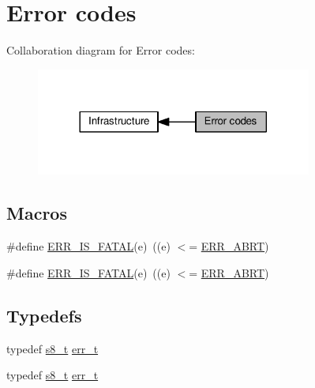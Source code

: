 \hypertarget{group__infrastructure__errors}{}\section{Error codes}
\label{group__infrastructure__errors}
Collaboration diagram for Error codes\+:
\nopagebreak
\begin{figure}[H]
\begin{center}
\leavevmode
\includegraphics[width=257pt]{group__infrastructure__errors}
\end{center}
\end{figure}
\subsection*{Macros}
\begin{DoxyCompactItemize}
\item 
\#define \hyperlink{group__infrastructure__errors_gac36f9cda08ffce1f67529a432a046248}{E\+R\+R\+\_\+\+I\+S\+\_\+\+F\+A\+T\+AL}(e)~((e) $<$= \hyperlink{group__infrastructure__errors_ggae2e66c7d13afc90ffecd6151680fbadcaf316b2c5eee4079820f7100849115142}{E\+R\+R\+\_\+\+A\+B\+RT})
\item 
\#define \hyperlink{group__infrastructure__errors_gac36f9cda08ffce1f67529a432a046248}{E\+R\+R\+\_\+\+I\+S\+\_\+\+F\+A\+T\+AL}(e)~((e) $<$= \hyperlink{group__infrastructure__errors_ggae2e66c7d13afc90ffecd6151680fbadcaf316b2c5eee4079820f7100849115142}{E\+R\+R\+\_\+\+A\+B\+RT})
\end{DoxyCompactItemize}
\subsection*{Typedefs}
\begin{DoxyCompactItemize}
\item 
typedef \hyperlink{group__compiler__abstraction_ga9cd1d7891fe315de1201e2c6e45f4f57}{s8\+\_\+t} \hyperlink{group__infrastructure__errors_gaf02d9da80fd66b4f986d2c53d7231ddb}{err\+\_\+t}
\item 
typedef \hyperlink{group__compiler__abstraction_ga9cd1d7891fe315de1201e2c6e45f4f57}{s8\+\_\+t} \hyperlink{group__infrastructure__errors_gaf02d9da80fd66b4f986d2c53d7231ddb}{err\+\_\+t}
\end{DoxyCompactItemize}
